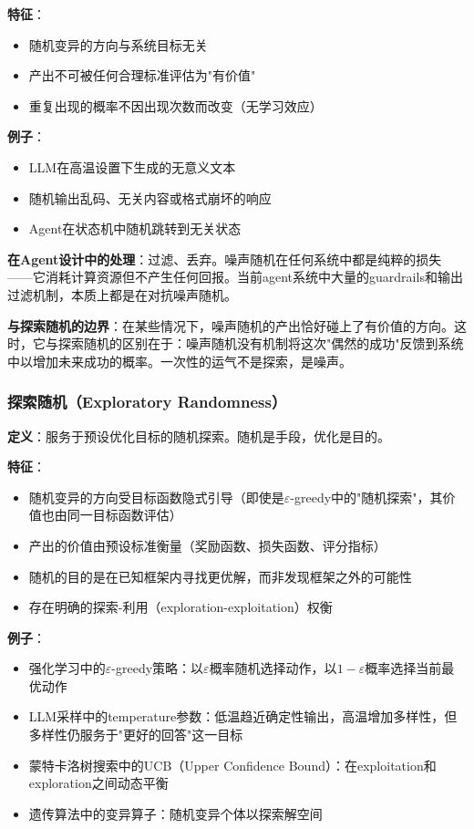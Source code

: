 \documentclass[12pt,a4paper]{ctexart}
\begin{document}
\textbf{特征}：
\begin{itemize}[nosep]
\item 随机变异的方向与系统目标无关
\item 产出不可被任何合理标准评估为"有价值"
\item 重复出现的概率不因出现次数而改变（无学习效应）
\end{itemize}

\textbf{例子}：
\begin{itemize}[nosep]
\item LLM在高温设置下生成的无意义文本
\item 随机输出乱码、无关内容或格式崩坏的响应
\item Agent在状态机中随机跳转到无关状态
\end{itemize}

\textbf{在Agent设计中的处理}：过滤、丢弃。噪声随机在任何系统中都是纯粹的损失——它消耗计算资源但不产生任何回报。当前agent系统中大量的guardrails和输出过滤机制，本质上都是在对抗噪声随机。

\textbf{与探索随机的边界}：在某些情况下，噪声随机的产出恰好碰上了有价值的方向。这时，它与探索随机的区别在于：噪声随机没有机制将这次"偶然的成功"反馈到系统中以增加未来成功的概率。一次性的运气不是探索，是噪声。

\subsubsection{探索随机（Exploratory Randomness）}

\textbf{定义}：服务于预设优化目标的随机探索。随机是手段，优化是目的。

\textbf{特征}：
\begin{itemize}[nosep]
\item 随机变异的方向受目标函数隐式引导（即使是$\varepsilon$-greedy中的"随机探索"，其价值也由同一目标函数评估）
\item 产出的价值由预设标准衡量（奖励函数、损失函数、评分指标）
\item 随机的目的是在已知框架内寻找更优解，而非发现框架之外的可能性
\item 存在明确的探索-利用（exploration-exploitation）权衡
\end{itemize}

\textbf{例子}：
\begin{itemize}[nosep]
\item 强化学习中的$\varepsilon$-greedy策略：以$\varepsilon$概率随机选择动作，以$1-\varepsilon$概率选择当前最优动作
\item LLM采样中的temperature参数：低温趋近确定性输出，高温增加多样性，但多样性仍服务于"更好的回答"这一目标
\item 蒙特卡洛树搜索中的UCB（Upper Confidence Bound）：在exploitation和exploration之间动态平衡
\item 遗传算法中的变异算子：随机变异个体以探索解空间
\end{itemize}
\end{document}
